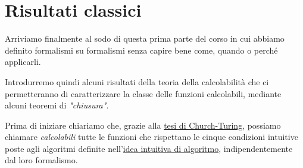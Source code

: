 \chapter{Risultati classici}
Arriviamo finalmente al sodo di questa prima parte del corso in
cui abbiamo definito formalismi su formalismi senza capire bene
come, quando o perché applicarli.

Introdurremo quindi alcuni risultati della teoria della
calcolabilità che ci permetteranno di caratterizzare la classe
delle funzioni calcolabili, mediante alcuni teoremi di
\emph{"chiusura"}.

Prima di iniziare chiariamo che, grazie alla
\hyperref[th: church-turing]{tesi di Church-Turing}, possiamo
chiamare \emph{calcolabili} tutte le funzioni che rispettano
le cinque condizioni intuitive poste agli algoritmi definite
nell'\hyperref[sec: algoritmo]{idea intuitiva di algoritmo},
indipendentemente dal loro formalismo.
